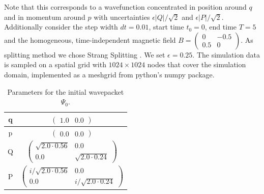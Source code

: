 \documentclass[11pt, a4paper, oneside]{article}
\begin{document}
 Note that this corresponds to a wavefunction concentrated in position around $q$ and in momentum around $p$ with uncertainties $\epsilon \lvert Q \rvert / \sqrt{2}$ and $\epsilon \lvert P \rvert / \sqrt{2}$. Additionally consider the step width $dt=0.01$, start time $t_0=0$, end time $T=5$ and the homogeneous, time-independent magnetic field $B = \begin{pmatrix} 0 & -0.5 \\ 0.5 & 0 \end{pmatrix}$. As splitting method we chose Strang Splitting . We set $\epsilon = 0.25$. The simulation data is sampled on a spatial grid with $1024 \times 1024$ nodes that cover the simulation domain, implemented as a meshgrid from python's numpy package.
\begin{table}[h]
  \centering
  \begin{tabular}{c|c}
    q & $\begin{pmatrix}1.0 & 0.0 \end{pmatrix}$ \\ \hline
    p & $\begin{pmatrix}0.0 & 0.0 \end{pmatrix}$ \\ \hline
    Q & $\begin{pmatrix}
      \sqrt{2.0 \cdot 0.56} & 0.0 \\
      0.0 & \sqrt{2.0 \cdot 0.24}
    \end{pmatrix}$ \\ \hline
    P & $\begin{pmatrix}
      i/\sqrt{2.0 \cdot 0.56} & 0.0 \\
      0.0 & i/\sqrt{2.0 \cdot 0.24}
    \end{pmatrix}$ \\
  \end{tabular}
  \caption{Parameters for the initial wavepacket $\Psi_0$.}
  \label{tab:params}

\end{table}
\end{document}
